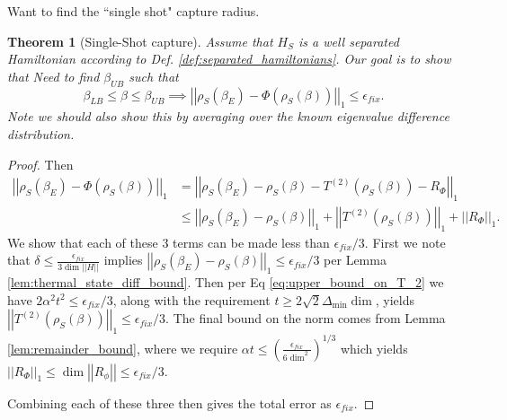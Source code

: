 \documentclass{article}
\newtheorem{theorem}{Theorem}
\newcommand{\parens}[1]{\left( #1 \right)}
\newcommand{\norm}[1]{\left| \left| #1 \right| \right|}
\begin{document}
Want to find the ``single shot" capture radius.
\begin{theorem}[Single-Shot capture]
    Assume that $H_S$ is a well separated Hamiltonian according to Def. \ref{def:separated_hamiltonians}. Our goal is to show that 
    Need to find $\beta_{UB}$ such that 
    \begin{equation}
        \beta_{LB} \leq \beta \leq \beta_{UB} \implies \norm{\rho_S(\beta_E) - \Phi(\rho_S(\beta))}_1 \leq \epsilon_{fix}.
    \end{equation}
    Note we should also show this by averaging over the known eigenvalue difference distribution.
\end{theorem}
\begin{proof}
    Then
    \begin{align}
        \norm{\rho_S(\beta_E) - \Phi(\rho_S(\beta))}_1 &= \norm{\rho_S(\beta_E) - \rho_S(\beta) - T^{(2)}(\rho_S(\beta)) - R_{\Phi}}_1 \\
        &\leq \norm{\rho_S(\beta_E) - \rho_S(\beta)}_1 + \norm{T^{(2)}(\rho_S(\beta))}_1 + \norm{R_{\Phi}}_1.
    \end{align}
    We show that each of these 3 terms can be made less than $\epsilon_{fix} / 3$. First we note that $\delta \leq \frac{\epsilon_{fix}}{3 \dim \norm{H}}$ implies $\norm{\rho_S(\beta_E) - \rho_S(\beta)}_1 \leq \epsilon_{fix} / 3$ per Lemma \ref{lem:thermal_state_diff_bound}. Then per Eq \eqref{eq:upper_bound_on_T_2} we have $2 \alpha^2 t^2 \leq \epsilon_{fix} / 3$, along with the requirement $t \geq 2 \sqrt{2} \Delta_{\min} \dim$, yields $\norm{T^{(2)}(\rho_S(\beta))}_1 \leq \epsilon_{fix} / 3$. The final bound on the norm comes from Lemma \ref{lem:remainder_bound}, where we require $\alpha t \leq \parens{\frac{\epsilon_{fix}}{6 \dim^2}}^{1/3}$ which yields $\norm{R_{\Phi}}_1 \leq \dim \norm{R_{\phi}} \leq \epsilon_{fix} / 3$. 

    Combining each of these three then gives the total error as $\epsilon_{fix}$.
\end{proof}
\end{document}
